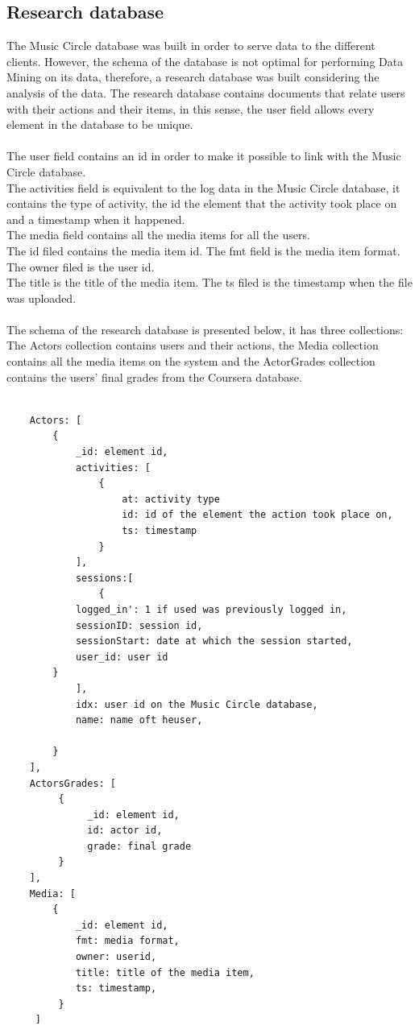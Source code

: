 \documentclass[11pt, oneside]{article}   	%
\begin{document}
\subsection{Research database}
The Music Circle database was built in order to serve data to the different clients. However, the schema of the database is not optimal for performing Data Mining on its data, therefore, a research database was built considering the analysis of the data. The research database contains documents that relate users with their actions and their items, in this sense, the user field allows every element in the database to be unique.\\\\ 
The user field contains an id in order to make it possible to link with the Music Circle database.\\ 
The activities field is equivalent to the log data in the Music Circle database, it contains the type of activity, the id the element that the activity took place on and a timestamp when it happened.\\ 
The media field contains all the media items for all the users.\\ 
The id filed contains the media item id. The fmt field is the media item format. The owner filed is the user id.\\ 
The title is the title of the media item. The ts filed is the timestamp when the file was uploaded.\\\\
The schema of the research database is presented below, it has three collections: The Actors collection contains users and their actions, the Media collection contains all the media items on the system and the ActorGrades collection contains the users' final grades from the Coursera database.
\begin{verbatim}

    Actors: [
        {
            _id: element id,
            activities: [
                {
                    at: activity type 
                    id: id of the element the action took place on,
                    ts: timestamp
                }
            ],
            sessions:[
            	{
		    logged_in': 1 if used was previously logged in, 
		    sessionID: session id, 
		    sessionStart: date at which the session started, 
		    user_id: user id
		}
            ],
            idx: user id on the Music Circle database,
            name: name oft heuser,
            
        }
    ],
    ActorsGrades: [
         {
              _id: element id,
              id: actor id,
              grade: final grade
         }
    ],
    Media: [
        {
            _id: element id,
            fmt: media format,
            owner: userid,
            title: title of the media item,
            ts: timestamp,
         }
     ]
    \end{verbatim}
\end{document}
